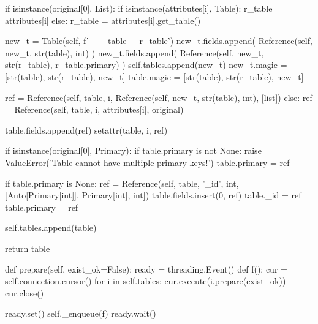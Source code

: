 \begin{pythoncode}
            if isinstance(original[0], List):
                if isinstance(attributes[i], Table):
                    r_table = attributes[i]
                else:
                    r_table = attributes[i].get_table()

                new_t = Table(self, f'___{table}__{r_table}')
                new_t.fields.append(
                    Reference(self, new_t, str(table), int)
                )
                new_t.fields.append(
                    Reference(self, new_t, str(r_table), r_table.primary)
                )
                self.tables.append(new_t)
                new_t.magic = [str(table), str(r_table), new_t]
                table.magic = [str(table), str(r_table), new_t]

                ref = Reference(self, table, i, Reference(self, new_t, str(table), int), [list])
            else:
                ref = Reference(self, table, i, attributes[i], original)

            table.fields.append(ref)
            setattr(table, i, ref)

            if isinstance(original[0], Primary):
                if table.primary is not None:
                    raise ValueError('Table cannot have multiple primary keys!')
                table.primary = ref

        if table.primary is None:
            ref = Reference(self, table, '_id', int, [Auto[Primary[int]], Primary[int], int])
            table.fields.insert(0, ref)
            table._id = ref
            table.primary = ref

        self.tables.append(table)

        return table

    def prepare(self, exist_ok=False):
        ready = threading.Event()
        def f():
            cur = self.connection.cursor()
            for i in self.tables:
                cur.execute(i.prepare(exist_ok))
            cur.close()

            ready.set()
        self._enqueue(f)
        ready.wait()

\end{pythoncode}
